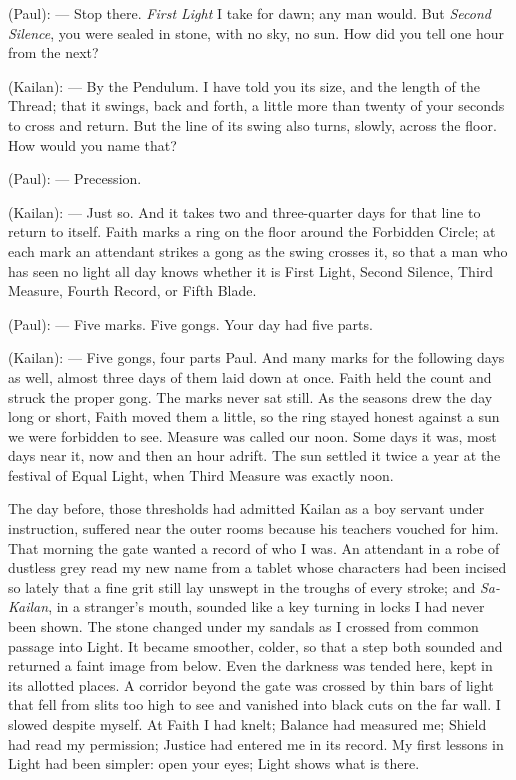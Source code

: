 \begin{room}

(Paul): --- Stop there. \textit{First Light} I take for dawn; any man would. But \textit{Second Silence}, you were sealed in stone, with no sky, no sun. How did you tell one hour from the next?

(Kailan): --- By the Pendulum. I have told you its size, and the length of the Thread; that it swings, back and forth, a little more than twenty of your seconds to cross and return. But the line of its swing also turns, slowly, across the floor. How would you name that?

(Paul): --- Precession.

(Kailan): --- Just so. And it takes two and three-quarter days for that line to return to itself. Faith marks a ring on the floor around the Forbidden Circle; at each mark an attendant strikes a gong as the swing crosses it, so that a man who has seen no light all day knows whether it is First Light, Second Silence, Third Measure, Fourth Record, or Fifth Blade.

(Paul): --- Five marks. Five gongs. Your day had five parts.

(Kailan): --- Five gongs, four parts Paul. And many marks for the following days as well, almost three days of them laid down at once. Faith held the count and struck the proper gong. The marks never sat still. As the seasons drew the day long or short, Faith moved them a little, so the ring stayed honest against a sun we were forbidden to see. Measure was called our noon. Some days it was, most days near it, now and then an hour adrift. The sun settled it twice a year at the festival of Equal Light, when Third Measure was exactly noon.

\end{room}

The day before, those thresholds had admitted Kailan as a boy servant under instruction, suffered near the outer rooms because his teachers vouched for him. That morning the gate wanted a record of who I was. An attendant in a robe of dustless grey read my new name from a tablet whose characters had been incised so lately that a fine grit still lay unswept in the troughs of every stroke; and \textit{Sa-Kailan}, in a stranger's mouth, sounded like a key turning in locks I had never been shown. The stone changed under my sandals as I crossed from common passage into Light. It became smoother, colder, so that a step both sounded and returned a faint image from below. Even the darkness was tended here, kept in its allotted places. A corridor beyond the gate was crossed by thin bars of light that fell from slits too high to see and vanished into black cuts on the far wall. I slowed despite myself. At Faith I had knelt; Balance had measured me; Shield had read my permission; Justice had entered me in its record. My first lessons in Light had been simpler: open your eyes; Light shows what is there.


